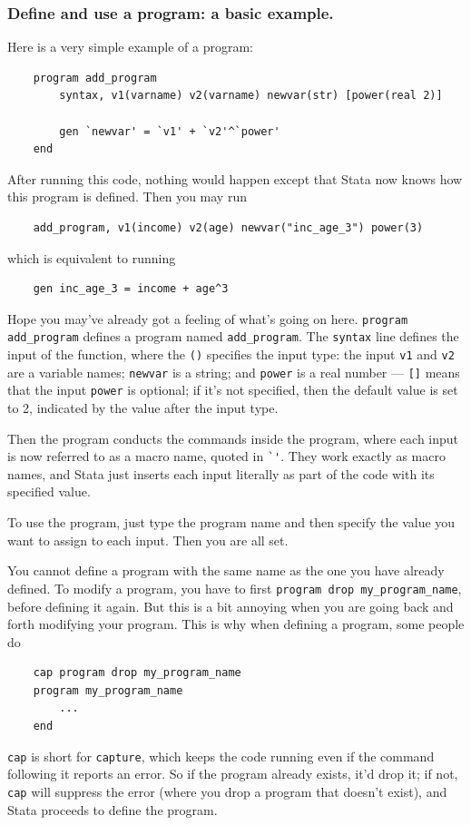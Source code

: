 \subsubsection{Define and use a program: a basic example.} Here is a very simple example of a program: 
\begin{verbatim}
    program add_program 
        syntax, v1(varname) v2(varname) newvar(str) [power(real 2)]

        gen `newvar' = `v1' + `v2'^`power'
    end
\end{verbatim}  
After running this code, nothing would happen except that Stata now knows how this program is defined. Then you may run
\begin{verbatim}
    add_program, v1(income) v2(age) newvar("inc_age_3") power(3) 
\end{verbatim}
which is equivalent to running
\begin{verbatim}
    gen inc_age_3 = income + age^3
\end{verbatim}
Hope you may've already got a feeling of what's going on here. \verb|program add_program| defines a program named \verb|add_program|. The \verb|syntax| line defines the input of the function, where the \verb|()| specifies the input type: the input \verb|v1| and \verb|v2| are a variable names; \verb|newvar| is a string; and \verb|power| is a real number --- \verb|[]| means that the input \verb|power| is optional; if it's not specified, then the default value is set to 2, indicated by the value after the input type. 

Then the program conducts the commands inside the program, where each input is now referred to as a macro name, quoted in \verb|`'|. They work exactly as macro names, and Stata just inserts each input literally as part of the code with its specified value. 

To use the program, just type the program name and then specify the value you want to assign to each input. Then you are all set. 

You cannot define a program with the same name as the one you have already defined. To modify a program, you have to first \verb|program drop my_program_name|, before defining it again. But this is a bit annoying when you are going back and forth modifying your program. This is why when defining a program, some people do
\begin{verbatim}
    cap program drop my_program_name
    program my_program_name
        ...
    end
\end{verbatim}
\verb|cap| is short for \verb|capture|, which keeps the code running even if the command following it reports an error. So if the program already exists, it'd drop it; if not, \verb|cap| will suppress the error (where you drop a program that doesn't exist), and Stata proceeds to define the program. 

